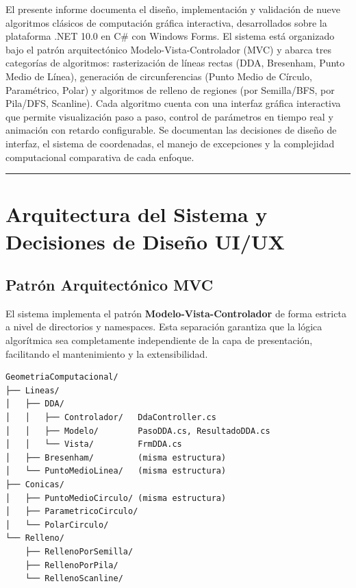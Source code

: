 \documentclass[
  spanish,
  a4paper,
  12pt,
]{article}
\begin{document}
El presente informe documenta el diseño, implementación y validación de
nueve algoritmos clásicos de computación gráfica interactiva,
desarrollados sobre la plataforma .NET 10.0 en C\# con Windows Forms. El
sistema está organizado bajo el patrón arquitectónico
Modelo-Vista-Controlador (MVC) y abarca tres categorías de algoritmos:
rasterización de líneas rectas (DDA, Bresenham, Punto Medio de Línea),
generación de circunferencias (Punto Medio de Círculo, Paramétrico,
Polar) y algoritmos de relleno de regiones (por Semilla/BFS, por
Pila/DFS, Scanline). Cada algoritmo cuenta con una interfaz gráfica
interactiva que permite visualización paso a paso, control de parámetros
en tiempo real y animación con retardo configurable. Se documentan las
decisiones de diseño de interfaz, el sistema de coordenadas, el manejo
de excepciones y la complejidad computacional comparativa de cada
enfoque.

\begin{center}\rule{0.5\linewidth}{0.5pt}\end{center}

\section{Arquitectura del Sistema y Decisiones de Diseño
UI/UX}\label{arquitectura-del-sistema-y-decisiones-de-diseuxf1o-uiux}

\subsection{Patrón Arquitectónico
MVC}\label{patruxf3n-arquitectuxf3nico-mvc}

El sistema implementa el patrón \textbf{Modelo-Vista-Controlador} de
forma estricta a nivel de directorios y namespaces. Esta separación
garantiza que la lógica algorítmica sea completamente independiente de
la capa de presentación, facilitando el mantenimiento y la
extensibilidad.

\begin{lstlisting}
GeometriaComputacional/
├── Lineas/
│   ├── DDA/
│   │   ├── Controlador/   DdaController.cs
│   │   ├── Modelo/        PasoDDA.cs, ResultadoDDA.cs
│   │   └── Vista/         FrmDDA.cs
│   ├── Bresenham/         (misma estructura)
│   └── PuntoMedioLinea/   (misma estructura)
├── Conicas/
│   ├── PuntoMedioCirculo/ (misma estructura)
│   ├── ParametricoCirculo/
│   └── PolarCirculo/
└── Relleno/
    ├── RellenoPorSemilla/
    ├── RellenoPorPila/
    └── RellenoScanline/
\end{lstlisting}
\end{document}
